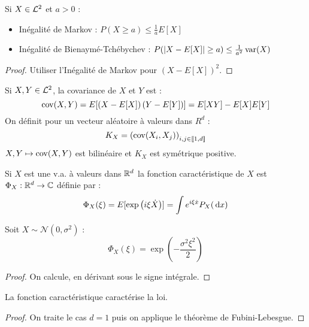 \documentclass{cours}
\begin{document}
    \begin{proposition}
        Si $X \in \mathcal{L}^{2}$ et $a > 0$ : 
        \begin{itemize}
            \item Inégalité de Markov : $P(X \geq a) \leq \frac{1}{a}E[X]$
            \item Inégalité de Bienaymé-Tchébychev : $P(\left|X - E[X]\right| \geq a) \leq \frac{1}{a^{2}}\operatorname{var}(X)$
        \end{itemize}
    \end{proposition}
    \begin{proof}
        Utiliser l'Inégalité de Markov pour $\left(X - E[X]\right)^{2}$. 
    \end{proof}

    \begin{definition}
        Si $X, Y \in \mathcal{L}^{2}$, la covariance de $X$ et $Y$ est :
        \[
            \operatorname{cov}(X, Y) = E[\left(X - E[X]\right)\left(Y - E[Y]\right)] = E[XY] - E[X]E[Y]
        \]
        On définit pour un vecteur aléatoire à valeurs dans $R^{d}$ : 
        \[
            K_{X} = \left(\operatorname{cov}(X_{i}, X_{j})\right)_{i, j \in \llbracket 1,d\rrbracket}
        \]
        $X, Y \mapsto \operatorname{cov}(X, Y)$ est bilinéaire et $K_{X}$ est symétrique positive. 
    \end{definition}

    \begin{definition}
        Si $X$ est une v.a. à valeurs dans $\mathbb{R}^{d}$ la fonction caractéristique de $X$ est $\Phi_{X} : \mathbb{R}^{d} \rightarrow \mathbb{C}$ définie par : 
        \[
            \Phi_{X}(\xi) = E[\exp\left(i\xi \dot X\right)] = \int e^{i\xi \dot x}P_{X}({\rm \, d} x)
        \]
    \end{definition}

    \begin{lemma}
        Soit $X \sim \mathcal{N}(0, \sigma^{2})$ : 
        \[
            \Phi_{X}(\xi) = \exp\left(-\frac{\sigma^{2}\xi^{2}}{2}\right)
        \]
    \end{lemma}
    \begin{proof}
        On calcule, en dérivant sous le signe intégrale. 
    \end{proof}

    \begin{theorem}
        La fonction caractéristique caractérise la loi.
    \end{theorem}
    \begin{proof}
        On traite le cas $d = 1$ puis on applique le théorème de Fubini-Lebesgue.
    \end{proof}
\end{document}
